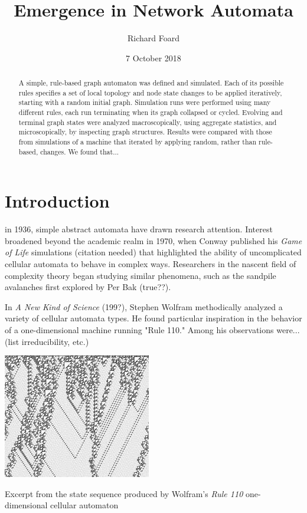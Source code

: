\documentclass{tufte-handout}
\title{Emergence in Network Automata}
\author{Richard Foard}
\date{7 October 2018}  %
\begin{document}
\maketitle%


\begin{abstract}
\noindent A simple, rule-based
graph automaton was defined and simulated. Each of its possible rules specifies a set
of local topology and node state changes to be applied iteratively, starting with a random initial graph.
Simulation runs were performed using many different rules, each run terminating when its graph
collapsed or cycled.
Evolving and terminal graph states were analyzed macroscopically, using
aggregate statistics, and microscopically, by inspecting graph structures.
Results were compared with those from simulations of a machine that
iterated by applying random, rather than rule-based, changes. We found that...
\end{abstract}

\section{Introduction}

 in 1936, simple abstract automata have drawn research attention.
Interest broadened beyond the academic realm in 1970,
when Conway published his \textit{Game of Life} simulations (citation needed) that highlighted the ability
of uncomplicated cellular automata to behave in complex ways. Researchers in the
nascent field of complexity theory began studying similar phenomena, such as the
sandpile avalanches first explored by Per Bak (true??).

In \textit{A New Kind of Science} (199?), Stephen Wolfram methodically analyzed
a variety of cellular automata types. He found particular inspiration in the
behavior of a one-dimensional machine running "Rule 110." Among his observations were... (list
irreducibility, etc.)

\begin{marginfigure}
\includegraphics{rule110.jpeg}
\caption{Excerpt from the state sequence produced by Wolfram's \textit{Rule 110}
one-dimensional cellular automaton}
\end{marginfigure}
\end{document}
